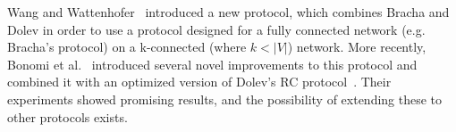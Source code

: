 Wang and Wattenhofer~\cite{bracha-dolev} introduced a new protocol,  which combines Bracha and Dolev in order to use a protocol designed for a fully connected network (e.g. Bracha's protocol) on a k-connected (where $k < |V|$) network. More recently, Bonomi et al.~\cite{bonomi2021practical} introduced several novel improvements to this protocol and combined it with an optimized version of Dolev's RC protocol~\cite{dolev-improvement,bonomi2019multihop}. Their experiments showed promising results, and the possibility of extending these to other protocols exists. 

